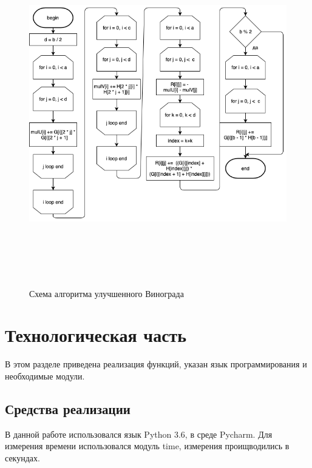 \documentclass[12pt]{article}
\begin{document}
\newpage
\begin{figure}[ht!]
	\centering
	\includegraphics[width=150mm, height=150mm]{opt.png}
	\caption{Схема алгоритма улучшенного Винограда \label{overflow}}
\end{figure}
\newpage
\section{Технологическая часть}

В этом разделе приведена реализация функций, указан язык программирования и необходимые модули. 
\subsection{Средства реализации}
В данной работе использовался язык Python 3.6, в среде Pycharm. Для измерения времени использовался модуль time, измерения проищводились в секундах.
\end{document}
